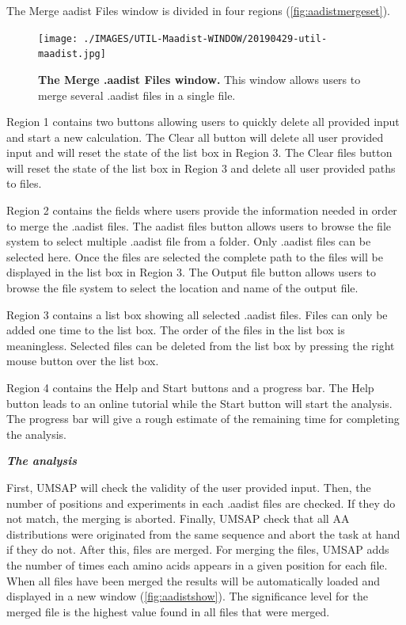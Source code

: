 The Merge aadist Files window is divided in four regions (\autoref{fig:aadistmergeset}).

\begin{figure}[h]
	\centering
	\texttt{[image: ./IMAGES/UTIL-Maadist-WINDOW/20190429-util-maadist.jpg]}	    
	\caption[The Merge .aadist Files window]{\textbf{The Merge .aadist Files window.} This window allows users to merge several .aadist files in a single file.}
	\label{fig:aadistmergeset}
	\vspace{-5pt} 	
\end{figure}

Region \num{1} contains two buttons allowing users to quickly delete all provided input and start a new calculation. The Clear all button will delete all user provided input and will reset the state of the list box in Region \num{3}. The Clear files button will reset the state of the list box in Region \num{3} and delete all user provided paths to files.

Region \num{2} contains the fields where users provide the information needed in order to merge the .aadist files. The aadist files button allows users to browse the file system to select multiple .aadist file from a folder. Only .aadist files can be selected here. Once the files are selected the complete path to the files will be displayed in the list box in Region \num{3}. The Output file button allows users to browse the file system to select the location and name of the output file.

Region \num{3} contains a list box showing all selected .aadist files. Files can only be added one time to the list box. The order of the files in the list box is meaningless. Selected files can be deleted from the list box by pressing the right mouse button over the list box. 

Region \num{4} contains the Help and Start buttons and a progress bar. The Help button leads to an online tutorial while the Start button will start the analysis. The progress bar will give a rough estimate of the remaining time for completing the analysis.

\textit{\textbf{The analysis}}

First, UMSAP will check the validity of the user provided input. Then, the number of positions and experiments in each .aadist files are checked. If they do not match, the merging is aborted. Finally, UMSAP check that all AA distributions were originated from the same sequence and abort the task at hand if they do not. After this, files are merged. For merging the files, UMSAP adds the number of times each amino acids appears in a given position for each file. When all files have been merged the results will be automatically loaded and displayed in a new window (\autoref{fig:aadistshow}). The significance level for the merged file is the highest value found in all files that were merged.

